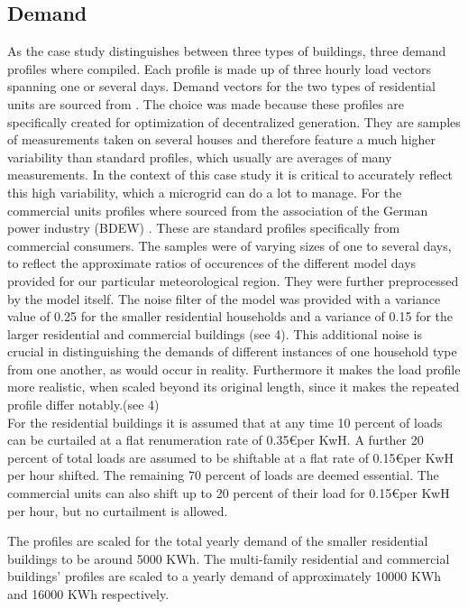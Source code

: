 \documentclass[
	11pt,								%
	DIV10,								%
	a4paper,         					%
	oneside,							%
	headheight=20pt,					%
	footheight=20pt,					%
    parskip=full,						%
    listof=totoc,						%
	bibliography=totoc,					%
	index=totoc,						%
]{scrartcl}
\begin{document}
\subsection{Demand}
As the case study distinguishes between three types of buildings, three demand profiles where compiled. Each profile is made up of three hourly load vectors spanning one or several days. Demand vectors for the two types of residential units are sourced from \cite{vereindeutscheringenieureReferenzlastprofileUndMehrfamilien2008}. The choice was made because these profiles are specifically created for optimization of decentralized generation. They are samples of measurements taken on several houses and therefore feature a much higher variability than standard profiles, which usually are averages of many measurements. In the context of this case study it is critical to accurately reflect this high variability, which a microgrid can do a lot to manage. For the commercial units profiles where sourced from the association of the German power industry (BDEW) \cite{fuenfgeldAnwendungRepraesentativenVDEWLastprofile2000}\cite{bdewStandardlastprofileStrom2017}. These are standard profiles specifically from commercial consumers. The samples were of varying sizes of one to several days, to reflect the approximate ratios of occurences of the different model days provided for our particular meteorological region. They were further preprocessed by the model itself. The noise filter of the model was provided with a variance value of 0.25 for the smaller residential households and a variance of 0.15 for the larger residential and commercial buildings (see 4). This additional noise is crucial in distinguishing the demands of different instances of one household type from one another, as would occur in reality. Furthermore it makes the load profile more realistic, when scaled beyond its original length, since it makes the repeated profile differ notably.(see 4)
\\
For the residential buildings it is assumed that at any time 10 percent of loads can be curtailed at a flat renumeration rate of 0.35\euro per KwH. A further 20 percent of total loads are assumed to be shiftable at a flat rate of 0.15\euro per KwH per hour shifted. The remaining 70 percent of loads are deemed essential. The commercial units can also shift up to 20 percent of their load for 0.15\euro per KwH per hour, but no curtailment is allowed.

The profiles are scaled for the total yearly demand of the smaller residential buildings to be around 5000 KWh. The multi-family residential and commercial buildings' profiles are scaled to a yearly demand of approximately 10000 KWh and 16000 KWh respectively. 
\end{document}
